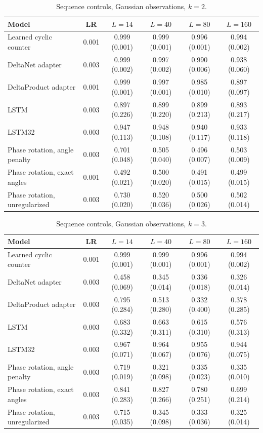 \begin{table}[tbp]
\centering\small
\caption{Sequence controls, Gaussian observations, $k=2$.}
\label{tab:newseq2}
\setlength{\tabcolsep}{3pt}
\begin{tabular}{lccccc}
\toprule
Model & LR & $L=14$ & $L=40$ & $L=80$ & $L=160$ \\
\midrule
Learned cyclic counter & 0.001 & 0.999 (0.001) & 0.999 (0.001) & 0.996 (0.001) & 0.994 (0.002) \\
DeltaNet adapter & 0.003 & 0.999 (0.002) & 0.997 (0.002) & 0.990 (0.006) & 0.938 (0.060) \\
DeltaProduct adapter & 0.001 & 0.999 (0.001) & 0.997 (0.001) & 0.985 (0.010) & 0.897 (0.097) \\
LSTM & 0.003 & 0.897 (0.226) & 0.899 (0.220) & 0.899 (0.213) & 0.893 (0.217) \\
LSTM32 & 0.003 & 0.947 (0.113) & 0.948 (0.108) & 0.940 (0.117) & 0.933 (0.118) \\
Phase rotation, angle penalty & 0.003 & 0.701 (0.048) & 0.505 (0.040) & 0.496 (0.007) & 0.503 (0.009) \\
Phase rotation, exact angles & 0.001 & 0.492 (0.021) & 0.500 (0.020) & 0.491 (0.015) & 0.499 (0.015) \\
Phase rotation, unregularized & 0.003 & 0.730 (0.020) & 0.520 (0.036) & 0.500 (0.026) & 0.502 (0.014) \\
\bottomrule
\end{tabular}
\end{table}

\begin{table}[tbp]
\centering\small
\caption{Sequence controls, Gaussian observations, $k=3$.}
\label{tab:newseq3}
\setlength{\tabcolsep}{3pt}
\begin{tabular}{lccccc}
\toprule
Model & LR & $L=14$ & $L=40$ & $L=80$ & $L=160$ \\
\midrule
Learned cyclic counter & 0.001 & 0.999 (0.001) & 0.999 (0.001) & 0.996 (0.001) & 0.994 (0.002) \\
DeltaNet adapter & 0.003 & 0.458 (0.069) & 0.345 (0.014) & 0.336 (0.018) & 0.326 (0.014) \\
DeltaProduct adapter & 0.003 & 0.795 (0.284) & 0.513 (0.280) & 0.332 (0.400) & 0.378 (0.285) \\
LSTM & 0.003 & 0.683 (0.332) & 0.663 (0.311) & 0.615 (0.310) & 0.576 (0.313) \\
LSTM32 & 0.003 & 0.967 (0.071) & 0.964 (0.067) & 0.955 (0.076) & 0.944 (0.075) \\
Phase rotation, angle penalty & 0.003 & 0.719 (0.019) & 0.321 (0.098) & 0.335 (0.023) & 0.335 (0.010) \\
Phase rotation, exact angles & 0.003 & 0.841 (0.283) & 0.827 (0.266) & 0.780 (0.251) & 0.699 (0.214) \\
Phase rotation, unregularized & 0.003 & 0.715 (0.035) & 0.345 (0.098) & 0.333 (0.036) & 0.325 (0.014) \\
\bottomrule
\end{tabular}
\end{table}

